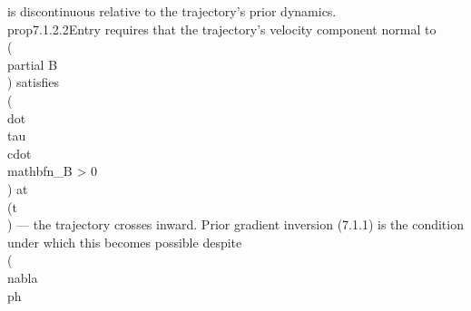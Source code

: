 {{{{{ is discontinuous relative to the trajectory's prior dynamics.}\n\n\\prop{7.1.2.2}{Entry requires that the trajectory's velocity component normal to \\(\\partial B\\) satisfies \\(\\dot{\\tau} \\cdot \\mathbf{n}_B > 0\\) at \\(t\\) — the trajectory crosses inward. Prior gradient inversion (7.1.1) is the condition under which this becomes possible despite \\(\\nabla\\ph}}}}}
